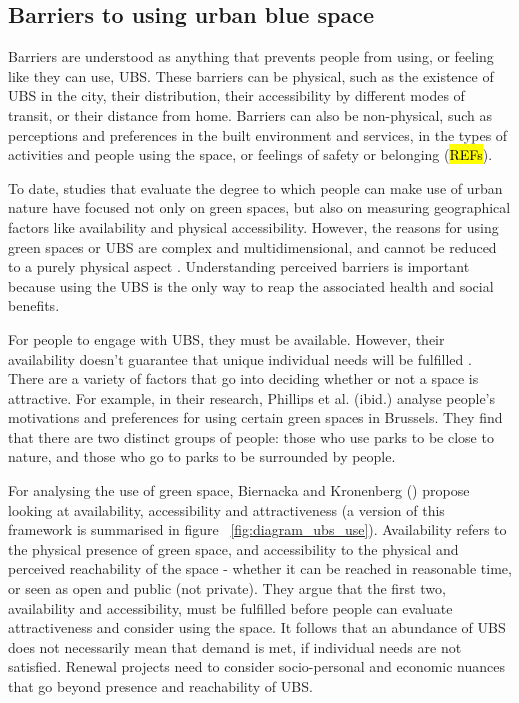\documentclass{article}
\begin{document}
\subsection{Barriers to using urban blue space}

Barriers are understood as anything that prevents people from using, or feeling like they can use, UBS.
These barriers can be physical, such as the existence of UBS in the city, their distribution, their accessibility by different modes of transit, or their distance from home. Barriers can also be non-physical, such as perceptions and preferences in the built environment and services, in the types of activities and people using the space, or feelings of safety or belonging (\hl{REFs}).

To date, studies that evaluate the degree to which people can make use of urban nature have focused not only on green spaces, but also on measuring geographical factors like availability and physical accessibility.
However, the reasons for using green spaces or UBS are complex and multidimensional, and cannot be reduced to a purely physical aspect \parencite{wang2015physical}. Understanding perceived barriers is important because using the UBS is the only way to reap the associated health and social benefits. 

For people to engage with UBS, they must be available. However, their availability doesn't guarantee that unique individual needs will be fulfilled \parencite{phillips2021use}. There are a variety of factors that go into deciding whether or not a space is attractive. For example, in their research, Phillips et al. (ibid.) analyse people's motivations and preferences for using certain green spaces in Brussels. They find that there are two distinct groups of people: those who use parks to be close to nature, and those who go to parks to be surrounded by people.

For analysing the use of green space, Biernacka and Kronenberg (\citeyear{biernacka2018classification}) propose looking at availability, accessibility and attractiveness (a version of this framework is summarised in figure ~\ref{fig:diagram_ubs_use}).
Availability refers to the physical presence of green space, and accessibility to the physical and perceived reachability of the space - whether it can be reached in reasonable time, or seen as open and public (not private). 
They argue that the first two, availability and accessibility, must be fulfilled before people can evaluate attractiveness and consider using the space. It follows that an abundance of UBS does not necessarily mean that demand is met, if individual needs are not satisfied. Renewal projects need to consider socio-personal and economic nuances that go beyond presence and reachability of UBS.
\end{document}
